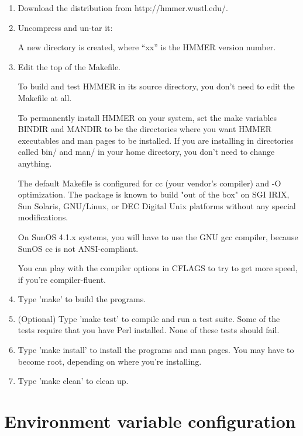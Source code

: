 \begin{enumerate}
\item Download the distribution from http://hmmer.wustl.edu/.

\item Uncompress and un-tar it:\\

	A new directory  is created, where ``xx'' is
	the HMMER version number.

\item Edit the top of the Makefile. 

To build and test HMMER in its source directory, you don't need to
edit the Makefile at all. 

To permanently install HMMER on your system, set the make variables
BINDIR and MANDIR to be the directories where you want HMMER
executables and man pages to be installed. If you are installing in
directories called bin/ and man/ in your home directory, you don't
need to change anything.

The default Makefile is configured for cc (your vendor's compiler) and
-O optimization. The package is known to build "out of the box" on SGI
IRIX, Sun Solaris, GNU/Linux, or DEC Digital Unix platforms without
any special modifications. 

On SunOS 4.1.x systems, you will have to use the GNU gcc compiler,
because SunOS cc is not ANSI-compliant.

You can play with the compiler options in CFLAGS to try to get more
speed, if you're compiler-fluent. 

\item Type 'make' to build the programs.

\item (Optional) Type 'make test' to compile and run a test suite.
Some of the tests require that you have Perl installed. None of these
tests should fail.

\item Type 'make install' to install the programs and man pages. 
You may have to become root, depending on where you're installing.

\item Type 'make clean' to clean up.
\end{enumerate}

\section{Environment variable configuration}


